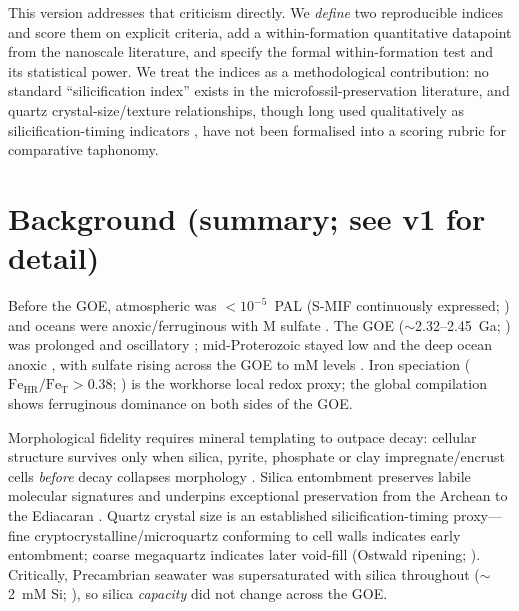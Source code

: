 \documentclass[11pt]{article}
\begin{document}
This version addresses that criticism directly. We \emph{define} two reproducible indices and score
them on explicit criteria, add a within-formation quantitative datapoint from the nanoscale
literature, and specify the formal within-formation test and its statistical power. We treat the
indices as a methodological contribution: no standard ``silicification index'' exists in the
microfossil-preservation literature, and quartz crystal-size/texture relationships, though long used
qualitatively as silicification-timing indicators \citep{Moore2025}, have not been formalised into a
scoring rubric for comparative taphonomy.

\section{Background (summary; see v1 for detail)}

Before the GOE, atmospheric  was $<10^{-5}$~PAL (S-MIF continuously expressed;
\citealp{Pavlov2002,Farquhar2000}) and oceans were anoxic/ferruginous with \textmu M sulfate
\citep{Habicht2002,Crowe2014}. The GOE ($\sim$2.32--2.45~Ga; \citealp{Bekker2004}) was prolonged and
oscillatory \citep{Lyons2014,Garduno2024}; mid-Proterozoic  stayed low
\citep{Planavsky2014} and the deep ocean anoxic \citep{Canfield1998}, with sulfate rising across the
GOE to mM levels \citep{Kah2004}. Iron speciation
($\mathrm{Fe_{HR}}/\mathrm{Fe_T}>0.38$; \citealp{Poulton2005,Poulton2011}) is the workhorse local
redox proxy; the global compilation shows ferruginous dominance on both sides of the GOE.

Morphological fidelity requires mineral templating to outpace decay: cellular structure survives
only when silica, pyrite, phosphate or clay impregnate/encrust cells \emph{before} decay collapses
morphology \citep{Wacey2012}. Silica entombment preserves labile molecular signatures
\citep{Alleon2016silica} and underpins exceptional preservation from the Archean to the Ediacaran
\citep{Tarhan}. Quartz crystal size is an established silicification-timing proxy---fine
cryptocrystalline/microquartz conforming to cell walls indicates early entombment; coarse
megaquartz indicates later void-fill (Ostwald ripening; \citealp{Moore2025}). Critically, Precambrian
seawater was supersaturated with silica throughout ($\sim$2~mM Si; \citealp{Siever1992,Perry2003}),
so silica \emph{capacity} did not change across the GOE.

\end{document}

